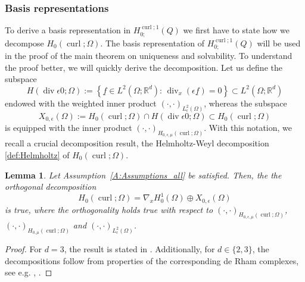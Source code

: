 \documentclass[a4paper,11pt]{article}
\newtheorem{lem}[thm]{Lemma}
\newcommand{\R}{\mathbb R}
\newcommand{\cu}{\operatorname{curl}}
\newcommand{\di}{\operatorname{div}}
\renewcommand{\vec}[1]{\underline{#1}}
\begin{document}
\subsubsection{Basis representations}\label{sec:BasisRep}
To derive a basis representation in $H^{\cu;1}_{0;}(Q)$ we first have to state how we decompose  $ H_0(\cu;\Omega)$. The basis representation of  $H^{\cu;1}_{0;}(Q)$  will be used in the proof of the main theorem on uniqueness and solvability. To understand the proof better, we will quickly derive the decomposition.
 Let us define the subspace
	\begin{equation*}
		H(\di \epsilon 0;\Omega) := \left\{ \vec f \in L^2(\Omega;\R^d) : \, \di_x (\epsilon \vec f) = 0 \right\} \subset L^2(\Omega;\R^d)
	\end{equation*}
	endowed with the weighted inner product $(\cdot, \cdot)_{L^2_\epsilon(\Omega)}$, whereas the subspace
	\begin{equation*}
		X_{0,\epsilon}(\Omega) := H_0(\cu;\Omega) \cap H(\di \epsilon 0;\Omega) \subset H_0(\cu;\Omega)
	\end{equation*}
	is equipped with the inner product $(\cdot, \cdot)_{H_{0,\epsilon,\mu}(\cu;\Omega)}$. With this notation, we recall a crucial decomposition result, the Helmholtz-Weyl decomposition \eqref{def:Helmholtz} of $H_0(\cu;\Omega)$.
	\begin{lem} \label{Lem:Helmholtz}
		Let Assumption~\ref{A:Assumptions_all} be satisfied. Then, the the orthogonal decomposition
		\begin{equation} \label{def:Helmholtz}
			H_0(\cu;\Omega) = \nabla_x H^1_0(\Omega) \oplus X_{0,\epsilon}(\Omega)
		\end{equation}
		is true, where the orthogonality holds true with respect to $(\cdot, \cdot)_{H_{0,\epsilon,\mu}(\cu;\Omega)}$, $(\cdot, \cdot)_{H_{0,\mu}(\cu;\Omega)}$ and $(\cdot, \cdot)_{L^2_\epsilon(\Omega)}$.
	\end{lem}
	\begin{proof}
		For $d=3$, the result is stated in \cite[Proposition~7.4.3]{Assous2018}. Additionally, for $d \in \{2,3\}$, the decompositions follow from properties of the corresponding de Rham complexes, see e.g. \cite[Section~2.3]{ArnoldFalkWinther}, \cite[Lemma~2.7, Lemma~3.6, Theorem~5.5]{PaulHilbertComplexes}.
	\end{proof}
\end{document}
